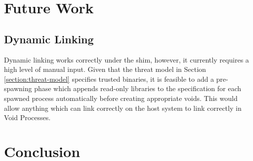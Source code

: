 \documentclass[a4paper,12pt,twoside,openright]{report}
\begin{document}
\section{Future Work}

\subsection{Dynamic Linking}

Dynamic linking works correctly under the shim, however, it currently requires a high level of manual input. Given that the threat model in Section \ref{section:threat-model} specifies trusted binaries, it is feasible to add a pre-spawning phase which appends read-only libraries to the specification for each spawned process automatically before creating appropriate voids. This would allow anything which can link correctly on the host system to link correctly in Void Processes.

\section{Conclusion}



\appendix
\singlespacing

 
 
\end{document}
